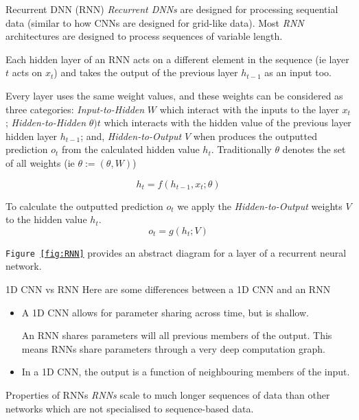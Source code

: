 \documentclass[11pt,a4paper]{article}
\begin{document}
  \begin{definition}{Recurrent DNN (RNN)}
    \textit{Recurrent DNNs} are designed for processing sequential data (similar to how CNNs are designed for grid-like data). Most \textit{RNN} architectures are designed to process sequences of variable length.

    \par Each hidden layer of an RNN acts on a different element in the sequence (ie layer $t$ acts on $x_t$) and takes the output of the previous layer $h_{t-1}$ as an input too.

    \par Every layer uses the same weight values, and these weights can be considered as three categories: \textit{Input-to-Hidden} $W$ which interact with the inputs to the layer $x_t$; \textit{Hidden-to-Hidden} $\theta)t$ which interacts with the hidden value of the previous layer hidden layer $h_{t-1}$; and, \textit{Hidden-to-Output} $V$ when produces the outputted prediction $o_t$ from the calculated hidden value $h_t$. Traditionally $\theta$ denotes the set of all weights (ie $\theta:=(\theta,W)$)

    \[ h_t=f(h_{t-1},x_t;\theta) \]

    To calculate the outputted prediction $o_t$ we apply the \textit{Hidden-to-Output} weights $V$ to the hidden value $h_t$.
    \[ o_t=g(h_t;V) \]

    \texttt{Figure \ref{fig:RNN}} provides an abstract diagram for a layer of a recurrent neural network.
  \end{definition}

  \begin{remark}{1D CNN vs RNN}
    Here are some differences between a 1D CNN and an RNN
    \begin{itemize}
      \item A 1D CNN allows for parameter sharing across time, but is shallow.
      \par An RNN shares parameters will all previous members of the output. This means RNNs share parameters through a very deep computation graph.
      \item In a 1D CNN, the output is a function of neighbouring members of the input.
    \end{itemize}
  \end{remark}

  \begin{remark}{Properties of RNNs}
    \textit{RNNs} scale to much longer sequences of data than other networks which are not specialised to sequence-based data.
  \end{remark}
\end{document}
